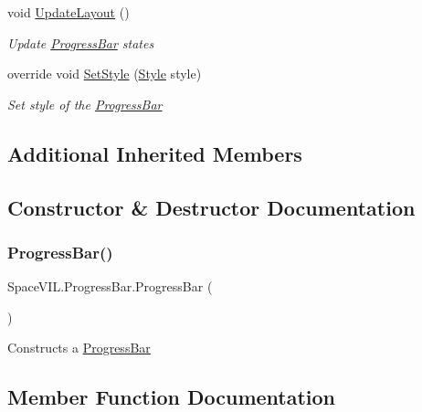 \begin{DoxyCompactItemize}
void \mbox{\hyperlink{class_space_v_i_l_1_1_progress_bar_a210b9b1fb096d851fcbc1aa34872f389}{Update\+Layout}} ()
\begin{DoxyCompactList}\small\item\em Update \mbox{\hyperlink{class_space_v_i_l_1_1_progress_bar}{Progress\+Bar}} states \end{DoxyCompactList}\item 
override void \mbox{\hyperlink{class_space_v_i_l_1_1_progress_bar_a7dc05324af7a604cef781aab687b17cc}{Set\+Style}} (\mbox{\hyperlink{class_space_v_i_l_1_1_decorations_1_1_style}{Style}} style)
\begin{DoxyCompactList}\small\item\em Set style of the \mbox{\hyperlink{class_space_v_i_l_1_1_progress_bar}{Progress\+Bar}} \end{DoxyCompactList}\end{DoxyCompactItemize}
\subsection*{Additional Inherited Members}


\subsection{Constructor \& Destructor Documentation}
\mbox{\label{class_space_v_i_l_1_1_progress_bar_afaaadcd993c494fd34bff6bd0385faa5}} 
\subsubsection{\texorpdfstring{Progress\+Bar()}{ProgressBar()}}
{\footnotesize\ttfamily Space\+V\+I\+L.\+Progress\+Bar.\+Progress\+Bar (\begin{DoxyParamCaption}{ }\end{DoxyParamCaption})}



Constructs a \mbox{\hyperlink{class_space_v_i_l_1_1_progress_bar}{Progress\+Bar}} 



\subsection{Member Function Documentation}
\mbox{\label{class_space_v_i_l_1_1_progress_bar_a5948fb4d1ee63baefb2624c03262a01c}} 
